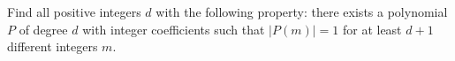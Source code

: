 Find all positive integers $d$ with the following property:  there exists a polynomial $P$ of degree $d$ with integer coefficients such that $\left|P(m)\right|=1$ for at least $d+1$ different integers $m$.